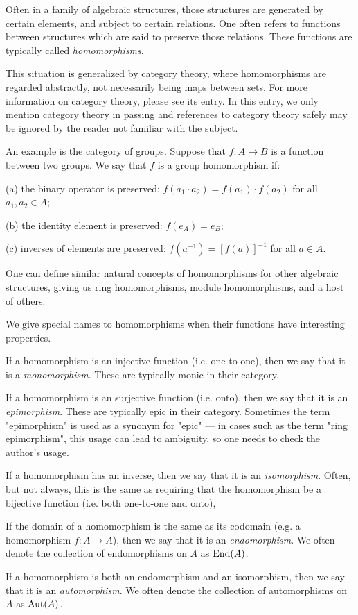 \documentclass{article}
\begin{document}
Often in a family of algebraic structures, 
those structures are generated by certain elements, 
and subject to certain relations.  
One often refers to functions between structures 
which are said to preserve those relations. 
These functions are typically called {\it homomorphisms}.

This situation is generalized by category theory, where
homomorphisms are regarded abstractly, not necessarily being
maps between sets.  For more information on category theory,
please see its entry.  In this entry, we only mention
category theory in passing and references to category
theory safely may be ignored by the reader not familiar with 
the subject.

An example is the category of groups.  
Suppose that $f:A \to B$ 
is a function between two groups.  
We say that $f$ is a group homomorphism if:

(a) the binary operator is preserved:
$f(a_1 \cdot a_2) = f(a_1) \cdot f(a_2)$ for all $a_1, a_2 \in A$;

(b) the identity element is preserved: 
$f(e_A) = e_B$;

(c) inverses of elements are preserved: 
$f(a^{-1}) = [f(a)]^{-1}$ for all $a \in A$.

One can define similar 
natural concepts of homomorphisms
for other algebraic structures,
giving us ring homomorphisms, 
module homomorphisms,
and a host of others.

We give special names to homomorphisms 
when their functions have interesting properties.

If a homomorphism is an injective function 
(i.e. one-to-one), 
then we say that it is a {\it monomorphism}.
These are typically monic in their category.

If a homomorphism is an surjective function 
(i.e. onto), 
then we say that it is an {\it epimorphism}.
These are typically epic in their category.
Sometimes the term "epimorphism" is used as
a synonym for "epic" --- in cases such as
the term "ring epimorphism", this usage can
lead to ambiguity, so one needs to check the
author's usage.

If a homomorphism has an inverse, 
then we say that it is an {\it isomorphism}.
Often, but not always, this is the same as
requiring that the homomorphism be a bijective function 
(i.e. both one-to-one and onto), 

If the domain of a homomorphism is the same as its codomain
(e.g. a homomorphism $f:A \to A$),
then we say that it is an {\it endomorphism}.
We often denote the collection of endomorphisms on $A$ as ${\rm End}(A)$.

If a homomorphism is both an endomorphism and an isomorphism,
then we say that it is an {\it automorphism}.
We often denote the collection of automorphisms on $A$ as ${\rm Aut}(A)$.
\end{document}
